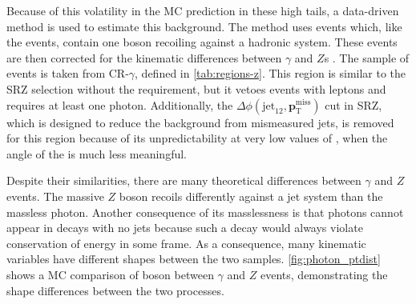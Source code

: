 Because of this volatility in the \ac{MC} prediction in these high \met tails, a data-driven method is used to estimate this background. The method uses \gjets events which, like the \dyjets events, contain one boson recoiling against a hadronic system. These \gjets events are then corrected for the kinematic differences between $\gamma$ and $Z$s \cite{ATLAS:2012ema, Chatrchyan:2012qka}. The sample of \gjets events is taken from CR-$\gamma$, defined in \autoref{tab:regions-z}. This region is similar to the SRZ selection without the \met  requirement, but it vetoes events with leptons and requires at least one photon. Additionally, the $\Delta\phi(\text{jet}_{12},{\boldsymbol p}_{\mathrm{T}}^\mathrm{miss})$ cut in SRZ, which is designed to reduce the background from mismeasured jets, is removed for this region because of its unpredictability at very low values of \met, when the angle of the \met is much less meaningful. 

Despite their similarities, there are many theoretical differences between $\gamma$ and $Z$ events. The massive $Z$ boson recoils differently against a jet system than the massless photon. Another consequence of its masslessness is that photons cannot appear in decays with no jets because such a decay would always violate conservation of energy in some frame. As a consequence, many kinematic variables have different shapes between the two samples. \autoref{fig:photon_ptdist} shows a \ac{MC} comparison of boson \pt between $\gamma$ and $Z$ events, demonstrating the shape differences between the two processes. 


